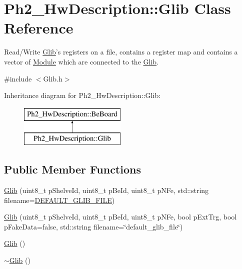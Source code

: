 \hypertarget{class_ph2___hw_description_1_1_glib}{\section{Ph2\-\_\-\-Hw\-Description\-:\-:Glib Class Reference}
\label{class_ph2___hw_description_1_1_glib}
}


Read/\-Write \hyperlink{class_ph2___hw_description_1_1_glib}{Glib}'s registers on a file, contains a register map and contains a vector of \hyperlink{class_ph2___hw_description_1_1_module}{Module} which are connected to the \hyperlink{class_ph2___hw_description_1_1_glib}{Glib}.  




{\ttfamily \#include $<$Glib.\-h$>$}

Inheritance diagram for Ph2\-\_\-\-Hw\-Description\-:\-:Glib\-:\begin{figure}[H]
\begin{center}
\leavevmode
\includegraphics[height=2.000000cm]{class_ph2___hw_description_1_1_glib}
\end{center}
\end{figure}
\subsection*{Public Member Functions}
\begin{DoxyCompactItemize}
\item 
\hyperlink{class_ph2___hw_description_1_1_glib_a07910146af6c6c3f4bf31f9985ab28f8}{Glib} (uint8\-\_\-t p\-Shelve\-Id, uint8\-\_\-t p\-Be\-Id, uint8\-\_\-t p\-N\-Fe, std\-::string filename=\hyperlink{_definition_8h_a9a33e5f7e6ec12c2dd3f55317c6c16f1}{D\-E\-F\-A\-U\-L\-T\-\_\-\-G\-L\-I\-B\-\_\-\-F\-I\-L\-E})
\item 
\hyperlink{class_ph2___hw_description_1_1_glib_a05a22fe40ace0d74f5493cbded54bd99}{Glib} (uint8\-\_\-t p\-Shelve\-Id, uint8\-\_\-t p\-Be\-Id, uint8\-\_\-t p\-N\-Fe, bool p\-Ext\-Trg, bool p\-Fake\-Data=false, std\-::string filename=\char`\"{}default\-\_\-glib\-\_\-file\char`\"{})
\item 
\hyperlink{class_ph2___hw_description_1_1_glib_a2d9eece9012cdc452f43895852693329}{Glib} ()
\item 
\hyperlink{class_ph2___hw_description_1_1_glib_a2fa668cf8b827199d63be060616a70cd}{$\sim$\-Glib} ()
\end{DoxyCompactItemize}
